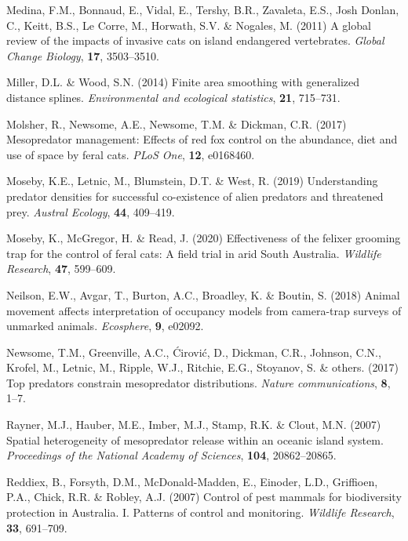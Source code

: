 \documentclass[]{elsarticle} %
\begin{document}
\leavevmode\hypertarget{ref-medina2011global}{}%
Medina, F.M., Bonnaud, E., Vidal, E., Tershy, B.R., Zavaleta, E.S., Josh Donlan, C., Keitt, B.S., Le Corre, M., Horwath, S.V. \& Nogales, M. (2011) A global review of the impacts of invasive cats on island endangered vertebrates. \emph{Global Change Biology}, \textbf{17}, 3503--3510.

\leavevmode\hypertarget{ref-miller2014finite}{}%
Miller, D.L. \& Wood, S.N. (2014) Finite area smoothing with generalized distance splines. \emph{Environmental and ecological statistics}, \textbf{21}, 715--731.

\leavevmode\hypertarget{ref-molsher2017mesopredator}{}%
Molsher, R., Newsome, A.E., Newsome, T.M. \& Dickman, C.R. (2017) Mesopredator management: Effects of red fox control on the abundance, diet and use of space by feral cats. \emph{PLoS One}, \textbf{12}, e0168460.

\leavevmode\hypertarget{ref-moseby2019understanding}{}%
Moseby, K.E., Letnic, M., Blumstein, D.T. \& West, R. (2019) Understanding predator densities for successful co-existence of alien predators and threatened prey. \emph{Austral Ecology}, \textbf{44}, 409--419.

\leavevmode\hypertarget{ref-moseby2020effectiveness}{}%
Moseby, K., McGregor, H. \& Read, J. (2020) Effectiveness of the felixer grooming trap for the control of feral cats: A field trial in arid South Australia. \emph{Wildlife Research}, \textbf{47}, 599--609.

\leavevmode\hypertarget{ref-neilson2018animal}{}%
Neilson, E.W., Avgar, T., Burton, A.C., Broadley, K. \& Boutin, S. (2018) Animal movement affects interpretation of occupancy models from camera-trap surveys of unmarked animals. \emph{Ecosphere}, \textbf{9}, e02092.

\leavevmode\hypertarget{ref-newsome2017top}{}%
Newsome, T.M., Greenville, A.C., Ćirović, D., Dickman, C.R., Johnson, C.N., Krofel, M., Letnic, M., Ripple, W.J., Ritchie, E.G., Stoyanov, S. \& others. (2017) Top predators constrain mesopredator distributions. \emph{Nature communications}, \textbf{8}, 1--7.

\leavevmode\hypertarget{ref-rayner2007spatial}{}%
Rayner, M.J., Hauber, M.E., Imber, M.J., Stamp, R.K. \& Clout, M.N. (2007) Spatial heterogeneity of mesopredator release within an oceanic island system. \emph{Proceedings of the National Academy of Sciences}, \textbf{104}, 20862--20865.

\leavevmode\hypertarget{ref-reddiex2007control}{}%
Reddiex, B., Forsyth, D.M., McDonald-Madden, E., Einoder, L.D., Griffioen, P.A., Chick, R.R. \& Robley, A.J. (2007) Control of pest mammals for biodiversity protection in Australia. I. Patterns of control and monitoring. \emph{Wildlife Research}, \textbf{33}, 691--709.
\end{document}
